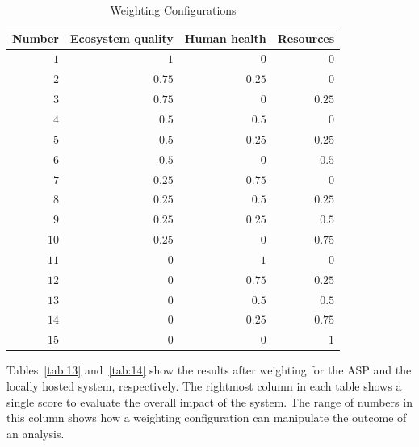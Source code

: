 \documentclass[final,journal,10pt,letterpaper,oneside,twocolumn,compsoc]%
{IEEEtran}
\begin{document}
\begin{table}[htbp]
  \caption{Weighting Configurations}
  \label{tab:12}
  \centering
    \begin{tabular}{| r | r | r | r |}
      \hline
      Number & Ecosystem quality & Human health & Resources \\
      \hline
      $1$  & $1$    & $0$    & $0$    \\
      $2$  & $0.75$ & $0.25$ & $0$    \\
      $3$  & $0.75$ & $0$    & $0.25$ \\
      $4$  & $0.5$  & $0.5$  & $0$    \\
      $5$  & $0.5$  & $0.25$ & $0.25$ \\
      $6$  & $0.5$  & $0$    & $0.5$  \\
      $7$  & $0.25$ & $0.75$ & $0$    \\
      $8$  & $0.25$ & $0.5$  & $0.25$ \\
      $9$  & $0.25$ & $0.25$ & $0.5$  \\
      $10$ & $0.25$ & $0$    & $0.75$ \\
      $11$ & $0$    & $1$    & $0$    \\
      $12$ & $0$    & $0.75$ & $0.25$ \\
      $13$ & $0$    & $0.5$  & $0.5$  \\
      $14$ & $0$    & $0.25$ & $0.75$ \\
      $15$ & $0$    & $0$    & $1$    \\
      \hline
    \end{tabular}
\end{table}

Tables~\ref{tab:13} and~\ref{tab:14} show the results after weighting for the ASP and the locally
hosted system, respectively. The rightmost column in each table shows a single
score to
evaluate the overall impact of the system. The range of numbers in this column
shows how a weighting configuration can manipulate the outcome of an analysis.
\end{document}
